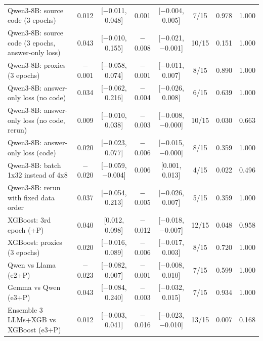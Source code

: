 \begin{table}[t]
{\begin{tabular}{lccccccc}
Qwen3-8B: source code (3 epochs) & 0.012 & [$-$0.011, 0.048] & 0.001 & [$-$0.004, 0.005] & 7/15 & 0.978 & 1.000 \\
Qwen3-8B: source code (3 epochs, answer-only loss) & 0.043 & [$-$0.010, 0.155] & $-$0.008 & [$-$0.021, $-$0.001] & 10/15 & 0.151 & 1.000 \\
Qwen3-8B: proxies (3 epochs) & $-$0.001 & [$-$0.058, 0.074] & $-$0.001 & [$-$0.011, 0.007] & 8/15 & 0.890 & 1.000 \\
Qwen3-8B: answer-only loss (no code) & 0.034 & [$-$0.062, 0.216] & $-$0.004 & [$-$0.026, 0.008] & 6/15 & 0.639 & 1.000 \\
Qwen3-8B: answer-only loss (no code, rerun) & 0.009 & [$-$0.010, 0.038] & $-$0.003 & [$-$0.008, $-$0.000] & 10/15 & 0.030 & 0.663 \\
Qwen3-8B: answer-only loss (code) & 0.020 & [$-$0.023, 0.077] & $-$0.006 & [$-$0.015, $-$0.000] & 8/15 & 0.359 & 1.000 \\
Qwen3-8B: batch 1x32 instead of 4x8 & $-$0.020 & [$-$0.059, $-$0.004] & 0.006 & [0.001, 0.013] & 4/15 & 0.022 & 0.496 \\
Qwen3-8B: rerun with fixed data order & 0.037 & [$-$0.054, 0.213] & $-$0.005 & [$-$0.026, 0.007] & 5/15 & 0.359 & 1.000 \\
XGBoost: 3rd epoch (+P) & 0.040 & [0.012, 0.098] & $-$0.012 & [$-$0.018, $-$0.007] & 12/15 & 0.048 & 0.958 \\
XGBoost: proxies (3 epochs) & 0.020 & [$-$0.016, 0.089] & $-$0.006 & [$-$0.017, 0.003] & 8/15 & 0.720 & 1.000 \\
Qwen vs Llama (e2+P) & $-$0.023 & [$-$0.082, 0.007] & $-$0.001 & [$-$0.008, 0.010] & 7/15 & 0.599 & 1.000 \\
Gemma vs Qwen (e3+P) & 0.043 & [$-$0.084, 0.240] & $-$0.003 & [$-$0.032, 0.015] & 7/15 & 0.934 & 1.000 \\
Ensemble 3 LLMs+XGB vs XGBoost (e3+P) & 0.012 & [$-$0.003, 0.041] & $-$0.016 & [$-$0.023, $-$0.010] & 13/15 & 0.007 & 0.168 \\
\bottomrule
\end{tabular}
}
\end{table}
